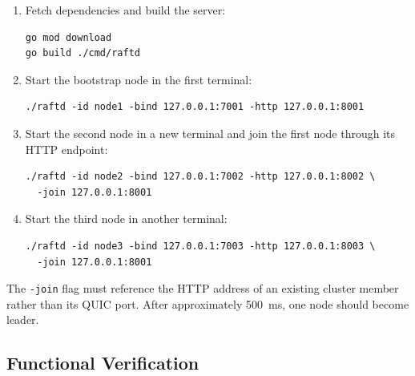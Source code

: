 \begin{enumerate}
\item Fetch dependencies and build the server:
\begin{verbatim}
go mod download
go build ./cmd/raftd
\end{verbatim}

\item Start the bootstrap node in the first terminal:
\begin{verbatim}
./raftd -id node1 -bind 127.0.0.1:7001 -http 127.0.0.1:8001
\end{verbatim}

\item Start the second node in a new terminal and join the first node through its HTTP endpoint:
\begin{verbatim}
./raftd -id node2 -bind 127.0.0.1:7002 -http 127.0.0.1:8002 \
  -join 127.0.0.1:8001
\end{verbatim}

\item Start the third node in another terminal:
\begin{verbatim}
./raftd -id node3 -bind 127.0.0.1:7003 -http 127.0.0.1:8003 \
  -join 127.0.0.1:8001
\end{verbatim}
\end{enumerate}

The \texttt{-join} flag must reference the HTTP address of an existing cluster member rather than its QUIC port. After approximately 500~ms, one node should become leader.

\subsection{Functional Verification}

